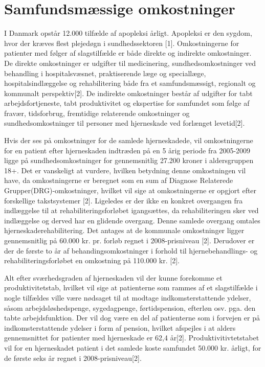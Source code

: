 \section{Samfundsmæssige omkostninger}
I Danmark opstår 12.000 tilfælde af apopleksi årligt. Apopleksi er den sygdom, hvor der kræves flest plejedøgn i sundhedssektoren [1]. %
Omkostningerne for patienter med følger af slagstilfælde er både direkte og indirekte omkostninger. De direkte omkostninger er udgifter til medicinering, sundhedsomkostninger ved behandling i hospitalsvæsnet, praktiserende læge og speciallæge, hospitalsindlæggelse og rehabilitering både fra et samfundsmæssigt, regionalt og kommunalt perspektiv[2]. De indirekte omkostninger består af udgifter for tabt arbejdsfortjeneste, tabt produktivitet og ekspertise for samfundet som følge af fravær, tidsforbrug, fremtidige relaterende omkostninger og sundhedsomkostninger til personer med hjerneskade ved forlænget levetid[2].

Hvis der ses på omkostninger for de samlede hjerneskadede, vil omkostningerne for en patient efter hjerneskaden indtræden på en 5 årig periode fra 2005-2009 ligge på sundhedsomkostninger for gennemsnitlig 27.200 kroner i aldersgruppen 18+. Det er vanskeligt at vurdere, hvilken betydning denne omkostningen vil have, da omkostningerne er beregnet som en sum af Diagnose Relaterede Grupper(DRG)-omkostninger, hvilket vil sige at omkostningerne er opgjort efter forskellige takstsystemer [2].
Ligeledes er der ikke en konkret overgangen fra indlæggelse til at rehabiliteringsforløbet igangsættes, da rehabiliteringen sker ved indlæggelse og derved har en glidende overgang. Denne samlede overgang omtales hjerneskaderehabilitering. Det antages at de kommunale omkostninger ligger gennemsnitlig på 60.000 kr. pr. forløb regnet i 2008-prisniveau [2]. Derudover er der de første to år af behandingsomkostninger i forhold til hjernebehandlings- og rehabiliteringsforløbet en omkostning på 110.000 kr. [2].

Alt efter sværhedsgraden af hjerneskaden vil der kunne forekomme et produktivitetstab, hvilket vil sige at patienterne som rammes af et slagstilfælde i nogle tilfældes ville være nødsaget til at modtage indkomsterstattende ydelser, såsom arbejdsløshedspenge, sygedagpenge, førtidspension, efterløn osv. pga. den tabte arbejdsfunktion. Der vil dog være en del af patienterne som i forvejen er på indkomsterstattende ydelser i form af pension, hvilket afspejles i at alders gennemsnittet for patienter med hjerneskade er 62,4 år[2]. Produktivitivtetstabet vil for en hjerneskadet patient i det samlede koste samfundet 50.000 kr. årligt, for de første seks år regnet i 2008-prisniveau[2]. 

